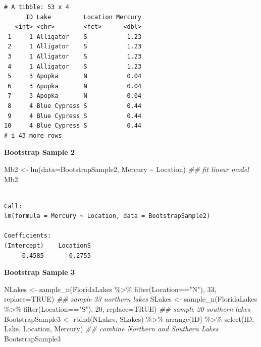 \documentclass[
  letterpaper,
  DIV=11,
  numbers=noendperiod]{scrreprt}
\newenvironment{Shaded}{\begin{snugshade}}{\end{snugshade}}
\newcommand{\AttributeTok}[1]{\textcolor[rgb]{0.40,0.45,0.13}{#1}}
\newcommand{\ConstantTok}[1]{\textcolor[rgb]{0.56,0.35,0.01}{#1}}
\newcommand{\DecValTok}[1]{\textcolor[rgb]{0.68,0.00,0.00}{#1}}
\newcommand{\DocumentationTok}[1]{\textcolor[rgb]{0.37,0.37,0.37}{\textit{#1}}}
\newcommand{\FunctionTok}[1]{\textcolor[rgb]{0.28,0.35,0.67}{#1}}
\newcommand{\NormalTok}[1]{\textcolor[rgb]{0.00,0.23,0.31}{#1}}
\newcommand{\OtherTok}[1]{\textcolor[rgb]{0.00,0.23,0.31}{#1}}
\newcommand{\SpecialCharTok}[1]{\textcolor[rgb]{0.37,0.37,0.37}{#1}}
\newcommand{\StringTok}[1]{\textcolor[rgb]{0.13,0.47,0.30}{#1}}
\begin{document}
\begin{verbatim}
# A tibble: 53 x 4
      ID Lake         Location Mercury
   <int> <chr>        <fct>      <dbl>
 1     1 Alligator    S           1.23
 2     1 Alligator    S           1.23
 3     1 Alligator    S           1.23
 4     1 Alligator    S           1.23
 5     3 Apopka       N           0.04
 6     3 Apopka       N           0.04
 7     3 Apopka       N           0.04
 8     4 Blue Cypress S           0.44
 9     4 Blue Cypress S           0.44
10     4 Blue Cypress S           0.44
# i 43 more rows
\end{verbatim}

\textbf{Bootstrap Sample 2}

\begin{Shaded}
\begin{Highlighting}[]
\NormalTok{Mb2 }\OtherTok{\textless{}{-}} \FunctionTok{lm}\NormalTok{(}\AttributeTok{data=}\NormalTok{BootstrapSample2, Mercury }\SpecialCharTok{\textasciitilde{}}\NormalTok{ Location) }\DocumentationTok{\#\# fit linear model}
\NormalTok{Mb2}
\end{Highlighting}
\end{Shaded}

\begin{verbatim}

Call:
lm(formula = Mercury ~ Location, data = BootstrapSample2)

Coefficients:
(Intercept)    LocationS  
     0.4585       0.2755  
\end{verbatim}

\textbf{Bootstrap Sample 3}

\begin{Shaded}
\begin{Highlighting}[]
\NormalTok{NLakes }\OtherTok{\textless{}{-}} \FunctionTok{sample\_n}\NormalTok{(FloridaLakes }\SpecialCharTok{\%\textgreater{}\%} \FunctionTok{filter}\NormalTok{(Location}\SpecialCharTok{==}\StringTok{"N"}\NormalTok{), }\DecValTok{33}\NormalTok{, }\AttributeTok{replace=}\ConstantTok{TRUE}\NormalTok{)   }\DocumentationTok{\#\# sample 33 northern lakes}
\NormalTok{SLakes }\OtherTok{\textless{}{-}} \FunctionTok{sample\_n}\NormalTok{(FloridaLakes }\SpecialCharTok{\%\textgreater{}\%} \FunctionTok{filter}\NormalTok{(Location}\SpecialCharTok{==}\StringTok{"S"}\NormalTok{), }\DecValTok{20}\NormalTok{, }\AttributeTok{replace=}\ConstantTok{TRUE}\NormalTok{)   }\DocumentationTok{\#\# sample 20 southern lakes}
\NormalTok{BootstrapSample3 }\OtherTok{\textless{}{-}} \FunctionTok{rbind}\NormalTok{(NLakes, SLakes) }\SpecialCharTok{\%\textgreater{}\%} \FunctionTok{arrange}\NormalTok{(ID) }\SpecialCharTok{\%\textgreater{}\%} 
  \FunctionTok{select}\NormalTok{(ID, Lake, Location, Mercury)   }\DocumentationTok{\#\# combine Northern and Southern Lakes}
\NormalTok{BootstrapSample3}
\end{Highlighting}
\end{Shaded}
\end{document}
